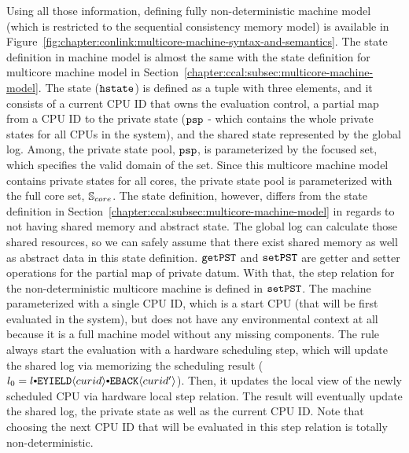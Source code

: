 Using all those information, defining fully non-deterministic machine model (which is restricted to the sequential consistency memory model) 
is available in Figure~\ref{fig:chapter:conlink:multicore-machine-syntax-and-semantics}.
The state definition in machine model is almost the same with the state definition for multicore machine model in Section~\ref{chapter:ccal:subsec:multicore-machine-model}. 
The state (${{\mathrm{\texttt{hstate}}}}$) is defined as a tuple with three elements, and it consists of a current CPU ID that owns the evaluation control,
a partial map from a CPU ID to the private state (${{\mathrm{\texttt{psp}}}}$ - which contains the whole private states for all CPUs in the system),
and the shared state represented by the global log. 
Among, 
the private state pool, ${{\mathrm{\texttt{psp}}}}$, is parameterized by 
the focused set, which specifies the valid domain of the set. 
Since this multicore machine model contains private states for all cores,
the private state pool is parameterized with the full core set, ${\mathbb{S}_{core}}$.
The state definition, however, differs from the state definition in Section~\ref{chapter:ccal:subsec:multicore-machine-model} 
in regards to not having shared memory and abstract state. 
The global log can calculate those shared resources, so we can safely assume that there exist shared memory as well as abstract data in this state definition. 
${{\mathrm{\texttt{getPST}}}}$ and ${{\mathrm{\texttt{setPST}}}}$ are getter and setter operations for the partial map of private datum. 
With that, 
the step relation for the non-deterministic multicore machine is defined in ${{\mathrm{\texttt{setPST}}}}$. 
The machine parameterized with a single CPU ID, which is a start CPU (that will be first evaluated in the system),
but does not have any environmental context at all because it is a full machine model without any missing components. 
The rule always start the evaluation 
with a hardware scheduling step, which will update the shared log via memorizing 
the scheduling result ($l_0 = \listconsoppo{\yieldbackev{curid'}}{\listconsoppo{\yieldev{curid}}{l}}$). 
Then, 
it updates the local view of the newly scheduled CPU via hardware local step relation. 
The result will eventually update the shared log, the private state as well as the current CPU ID. 
Note that choosing the next CPU ID that will be evaluated in this step relation is totally non-deterministic.